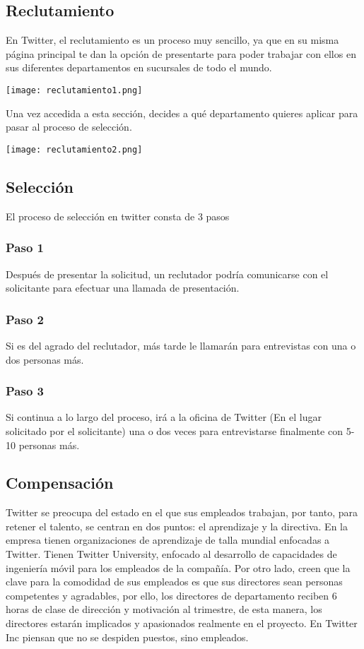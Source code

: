\subsection{Reclutamiento}

En Twitter, el reclutamiento es un proceso muy sencillo, ya que en su misma página principal te dan la opción de presentarte para poder trabajar con ellos en sus diferentes departamentos en sucursales de todo el mundo.

\texttt{[image: reclutamiento1.png]}
\newpage

Una vez accedida a esta sección, decides a qué departamento quieres aplicar para pasar al proceso de selección.

\texttt{[image: reclutamiento2.png]}

\subsection{Selección}

El proceso de selección en twitter consta de 3 pasos

\subsubsection{Paso 1}
Después de presentar la solicitud, un reclutador podría comunicarse con el solicitante para efectuar una llamada de presentación.

\subsubsection{Paso 2}
Si es del agrado del reclutador, más tarde le llamarán para entrevistas con una o dos personas más.

\subsubsection{Paso 3}
Si continua a lo largo del proceso, irá a la oficina de Twitter (En el lugar solicitado por el solicitante) una o dos veces para entrevistarse finalmente con 5-10 personas más.

\subsection{Compensación}

Twitter se preocupa del estado en el que sus empleados trabajan, por tanto, para retener el talento, se centran en dos puntos: el aprendizaje y la directiva.
En la empresa tienen organizaciones de aprendizaje de talla mundial enfocadas a Twitter. Tienen Twitter University, enfocado al desarrollo de capacidades de ingeniería móvil para los empleados de la compañía. Por otro lado, creen que la clave para la comodidad de sus empleados es que sus directores sean personas competentes y agradables, por ello, los directores de departamento reciben 6 horas de clase de dirección y motivación al trimestre, de esta manera, los directores estarán implicados y apasionados realmente en el proyecto. En Twitter Inc piensan que no se despiden puestos, sino empleados.

